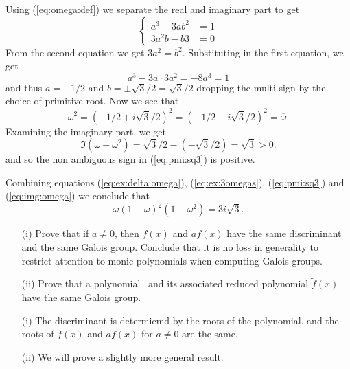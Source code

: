 \begin{myenumerate}
Using (\ref{eq:omega:def}) we separate the real and imaginary part to get
\begin{equation*}
 \left\{\begin{array}{rl}
       a^3-3ab^2    & = 1 \\
       3a^2b - b3 & = 0
       \end{array}\right.
\end{equation*}
From the second equation we get \(3a^2=b^2\).
Substituting in the first equation, we get
\begin{equation*}
 a^3 - 3a\cdot3a^2 = -8a^3 = 1
\end{equation*}
and thus \(a = -1/2\) and \(b = \pm \sqrt{3}/2 = \sqrt{3}/2\)
dropping the multi-sign by the choice of primitive root.
Now we see that
\begin{equation*}
\omega^2 = (-1/2 + i\sqrt{3}/2)^2 = (-1/2 - i\sqrt{3}/2)^2 = \overline{\omega}.
\end{equation*}
Examining the imaginary part, we get
\begin{equation}
\Im(\omega - \omega^2) = \sqrt{3}/2 -(-\sqrt{3}/2) = \sqrt{3} > 0.
                                                     \label{eq:img:omega}
\end{equation}
and so the non ambiguous sign in (\ref{eq:pmi:sq3}) is positive.

Combining equations
(\ref{eq:ex:delta:omega}),
(\ref{eq:ex:3omegas}),
(\ref{eq:pmi:sq3}) and
(\ref{eq:img:omega}) we conclude that
\begin{equation*}
 \omega(1 - \omega)^2(1 - \omega^2) = 3 i\sqrt{3}.
\end{equation*}

\item
\begin{excopy}
\begin{itemize}
 \item[(i)]
   Prove that if \(a \neq 0\), then \(f(x)\) and \(af(x)\) have the
   same discriminant and the same Galois group. Conclude that it is no
   loss in generality to restrict attention to monic polynomials when
   computing Galois groups.
 \item[(ii)]
   Prove that a polynomial \fx\ and its associated reduced polynomial
   \(\tilde{f}(x)\) have the same Galois group.
\end{itemize}
\end{excopy}

\begin{itemize}
 \item[(i)] The discriminant is determiemd by the roots of the polynomial.
 and the roots of \(f(x)\) and \(af(x)\) for \(a\neq 0 \) are the same.
 \item[(ii)]
 We will prove a slightly more general result.


\end{itemize}
\end{myenumerate}
